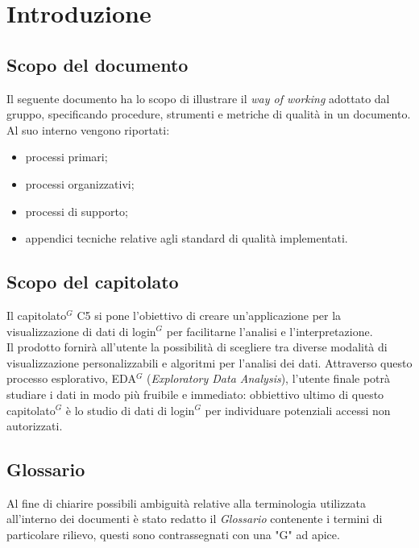 \section{Introduzione}
\subsection{Scopo del documento}

Il seguente documento ha lo scopo di illustrare il \textit{way of working} adottato dal gruppo, specificando procedure, strumenti e metriche di qualità in un documento.
Al suo interno vengono riportati:
\begin{itemize}
    \item processi primari;
    \item processi organizzativi;
    \item processi di supporto;
    \item appendici tecniche relative agli standard di qualità implementati.
\end{itemize}

\subsection{Scopo del capitolato}
Il capitolato$^{G}$ C5 si pone l'obiettivo di creare un'applicazione per la visualizzazione di dati
di login$^{G}$ per facilitarne l'analisi e l'interpretazione.\\
Il prodotto fornirà all'utente la possibilità di scegliere tra diverse modalità di visualizzazione personalizzabili 
e algoritmi per l'analisi dei dati. Attraverso questo processo esplorativo, EDA$^{G}$ (\textit{Exploratory Data Analysis}), 
l'utente finale potrà studiare i dati in modo più fruibile e immediato: obbiettivo ultimo di questo capitolato$^{G}$ 
è lo studio di dati di login$^{G}$ per individuare potenziali accessi non autorizzati.

\subsection{Glossario}
Al fine di chiarire possibili ambiguità relative alla terminologia utilizzata all'interno dei
documenti è stato redatto il \textit{Glossario} contenente i termini di particolare rilievo, questi
sono contrassegnati con una "G" ad apice.
\newpage